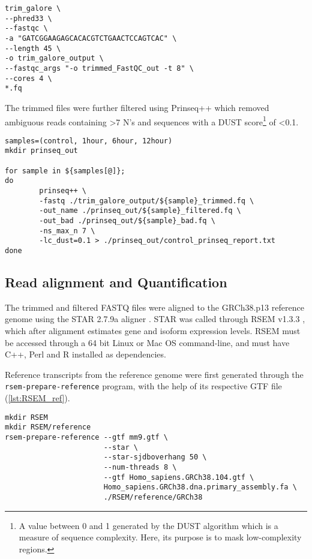 \begin{lstlisting}[caption=Trim Galore! trimming]
trim_galore \
--phred33 \
--fastqc \
-a "GATCGGAAGAGCACACGTCTGAACTCCAGTCAC" \
--length 45 \
-o trim_galore_output \
--fastqc_args "-o trimmed_FastQC_out -t 8" \
--cores 4 \
*.fq 
\end{lstlisting}

The trimmed files were further filtered using Prinseq++ \citep{prinseq++} which removed ambiguous reads containing >7 N's and sequences with a DUST score\footnote{A value between 0 and 1 generated by the DUST algorithm which is a measure of sequence complexity. Here, its purpose is to mask low-complexity regions.} of <0.1.

\begin{lstlisting}[caption=Prinseq++ filtering]
samples=(control, 1hour, 6hour, 12hour)
mkdir prinseq_out

for sample in ${samples[@]};
do
        prinseq++ \
        -fastq ./trim_galore_output/${sample}_trimmed.fq \
        -out_name ./prinseq_out/${sample}_filtered.fq \
        -out_bad ./prinseq_out/${sample}_bad.fq \
        -ns_max_n 7 \
        -lc_dust=0.1 > ./prinseq_out/control_prinseq_report.txt
done
\end{lstlisting}

\subsection{Read alignment and Quantification}
The trimmed and filtered FASTQ files were aligned to the GRCh38.p13 reference genome \citep{ref} using the \ac{STAR} 2.7.9a aligner \citep{Dobin2013}. \ac{STAR} was called through RSEM v1.3.3 \citep{li2011rsem}, which after alignment estimates gene and isoform expression levels. RSEM must be accessed through a 64 bit Linux or Mac OS command-line, and must have C++, Perl and R installed as dependencies.

Reference transcripts from the reference genome were first generated through the \texttt{rsem-prepare-reference} program, with the help of its respective GTF file (\autoref{lst:RSEM_ref}). 


\begin{lstlisting}[caption= reference generation, label={lst:RSEM_ref}]
mkdir RSEM
mkdir RSEM/reference
rsem-prepare-reference --gtf mm9.gtf \
                       --star \
                       --star-sjdboverhang 50 \
                       --num-threads 8 \
                       --gtf Homo_sapiens.GRCh38.104.gtf \
                       Homo_sapiens.GRCh38.dna.primary_assembly.fa \
                       ./RSEM/reference/GRCh38
\end{lstlisting}

